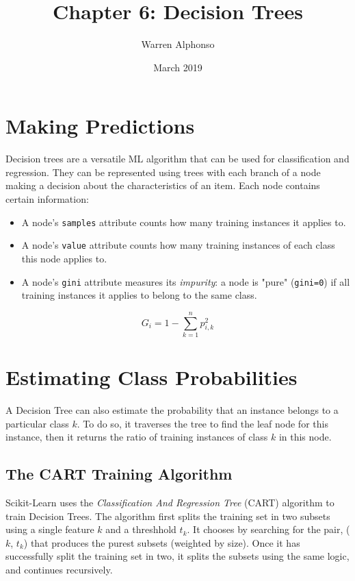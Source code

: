 \documentclass[letterpaper]{article}
\title{Chapter 6: Decision Trees}
\author{Warren Alphonso}
\date{March 2019}
\begin{document}
\maketitle

\section{Making Predictions}
Decision trees are a versatile ML algorithm that can be used for classification and regression. They can be represented using trees with each branch of a node making a decision about the characteristics of an item. Each node contains certain information:
\begin{itemize}
	\item A node's \texttt{samples} attribute counts how many training instances it applies to. 
	\item A node's \texttt{value} attribute counts how many training instances of each class this node applies to. 
	\item A node's \texttt{gini} attribute measures its \textsl{impurity}: a node is "pure" (\texttt{gini=0}) if all training instances it applies to belong to the same class. 
\end{itemize}

$$ 
G_{i} = 1 - \sum_{k=1}^{n} p_{i, k}^{2} 
$$

\section{Estimating Class Probabilities}
A Decision Tree can also estimate the probability that an instance belongs to a particular class $k$. To do so, it traverses the tree to find the leaf node for this instance, then it returns the ratio of training instances of class $k$ in this node. 

\subsection{The CART Training Algorithm}
Scikit-Learn uses the \textsl{Classification And Regression Tree} (CART) algorithm to train Decision Trees. The algorithm first splits the training set in two subsets using a single feature $k$ and a threshhold $t_{k}$. It chooses by searching for the pair, ($k$, $t_{k}$) that produces the purest subsets (weighted by size). Once it has successfully split the training set in two, it splits the subsets using the same logic, and continues recursively. 
\end{document}
